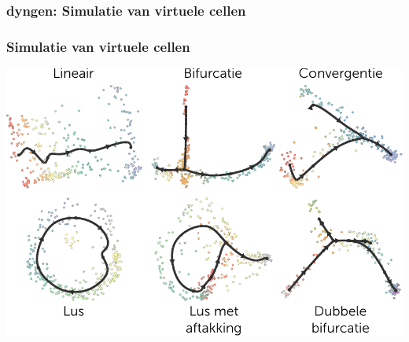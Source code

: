 \documentclass{beamer}
\begin{document}
\begin{frame}
	\frametitle{dyngen: Simulatie van virtuele cellen}
	\begin{center}
	\end{center}
\end{frame}

\begin{frame}
	\frametitle{Simulatie van virtuele cellen}
	\begin{center}
		\includegraphics[width=\linewidth]{figures/7_dyngen/example_runs.pdf}
	\end{center}
\end{frame}
\end{document}
